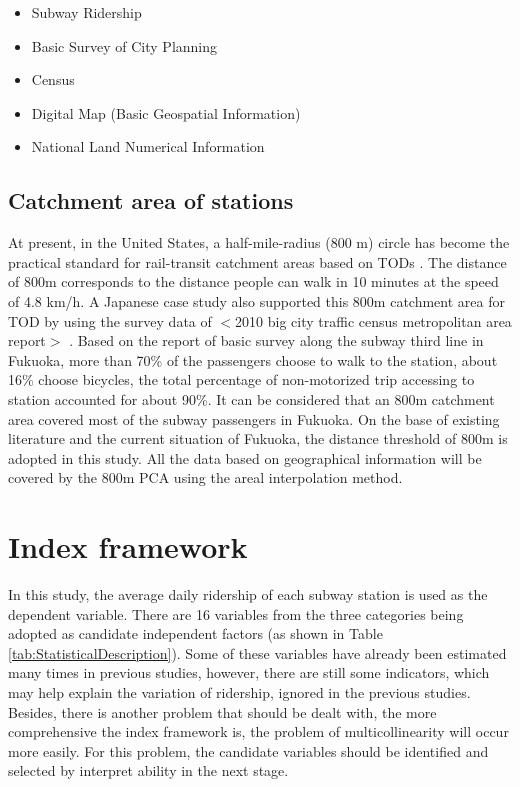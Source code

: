 \documentclass[utf8]{article}
\begin{document}
%
\begin{itemize}
	\item Subway Ridership
	\item Basic Survey of City Planning
	\item Census
	\item Digital Map (Basic Geospatial Information)
	\item National Land Numerical Information
\end{itemize}

%
\subsection{Catchment area of stations}
\indent

At present, in the United States, a half-mile-radius (800 m) circle has become the practical standard for rail-transit catchment areas based on TODs \cite{Guerra2013}. The distance of 800m corresponds to the distance people can walk in 10 minutes at the speed of 4.8 km/h. A Japanese case study also supported this 800m catchment area for TOD by using the survey data of $<$2010 big city traffic census metropolitan area report$>$ \cite{TadakatsuNakamura2015}. Based on the report of basic survey along the subway third line in Fukuoka, more than 70\% of the passengers choose to walk to the station, about 16\% choose bicycles, the total percentage of non-motorized trip accessing to station accounted for about 90\%. It can be considered that an 800m catchment area covered most of the subway passengers in Fukuoka. On the base of existing literature and the current situation of Fukuoka, the distance threshold of 800m is adopted in this study. All the data based on geographical information will be covered by the 800m PCA using the areal interpolation method.

%
\section{Index framework}
\indent

In this study, the average daily ridership of each subway station is used as the dependent variable. There are 16 variables from the three categories being adopted as candidate independent factors (as shown in Table \ref{tab:StatisticalDescription}). Some of these variables have already been estimated many times in previous studies, however, there are still some indicators, which may help explain the variation of ridership, ignored in the previous studies. Besides, there is another problem that should be dealt with, the more comprehensive the index framework is, the problem of multicollinearity will occur more easily. For this problem, the candidate variables should be identified and selected by interpret ability in the next stage.
\end{document}
